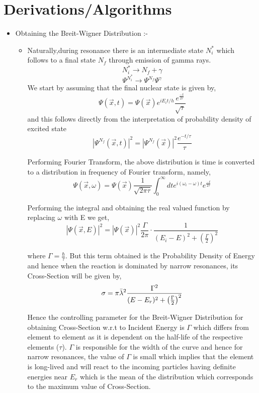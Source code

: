 \documentclass{article}
\begin{document}
\section{Derivations/Algorithms}
\begin{itemize}
\item Obtaining the Breit-Wigner Distribution :-
  \begin{itemize}
  \item Naturally,during  resonance there is an intermediate state $N_i^*$ which follows to a final state $N_f$ through emission of gamma rays.
    \[N_i^* \xrightarrow{} N_f + \gamma\]
    \[\Psi^{N_i^*} \xrightarrow{} \Psi^{N_f}\Psi^\gamma\]
    We start by assuming that the final nuclear state is given by,
    \[\Psi(\vec{x}, t) = \Psi(\vec{x})e^{iE_{i}t/h}\frac{e^\frac{-t}{2 \tau}}{\sqrt{\tau}}\]
    and this follows directly from the interpretation of probability density of excited state
    \[|\Psi^{N_f}(\vec{x},t)|^2 = |\Psi^{N_f}(\vec{x})|^2 \frac{e^{-t/\tau}}{\tau}\]

    Performing Fourier Transform, the above distribution is time is converted to a distribution in frequency of Fourier transform, namely,
    \[\Psi(\vec{x}, \omega) = \Psi(\vec{x})\frac{1}{\sqrt{2\pi \tau}}\int_0^\infty dt e^{i(\omega_i - \omega)t}e^\frac{-t}{2\tau}\]

    Performing the integral and obtaining the real valued function by replacing $\omega$ with E we get,
    \[|\Psi(\vec{x}, E)|^2 = |\Psi(\vec{x})|^2 \frac{\Gamma}{2\pi}\cdot\frac{1}{(E_i - E)^2 + (\frac{\Gamma}{2})^2}\]

    where $\Gamma = \frac{\hbar}{\tau}$. But this term obtained is the Probability Density of Energy and hence when the reaction is dominated by narrow resonances, its Cross-Section will be given by,
    \[\sigma = \pi \Bar{\lambda}^2 \frac{\Gamma^2}{(E - E_r)^2 + \left(\frac{\Gamma}{2}\right)^2}\]

    Hence the controlling parameter for the Breit-Wigner Distribution for obtaining Cross-Section w.r.t to Incident Energy is $\Gamma$ which differs from element to element as it is dependent on the half-life of the respective elements ($\tau$). $\Gamma$ is responsible for the width of the curve and hence for narrow resonances, the value of $\Gamma$ is small which implies that the element is long-lived and will react to the incoming particles having definite energies near $E_r$ which is the mean of the distribution which corresponds to the maximum value of Cross-Section.
  \end{itemize}
\end{itemize}
\end{document}

